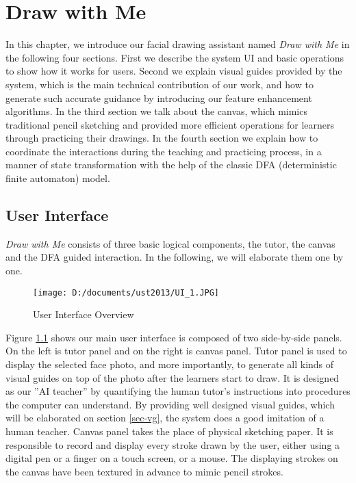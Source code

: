 \chapter{Draw with Me} \label{sec-mainwork}

		In this chapter, we introduce our facial drawing assistant named  \textit{Draw with Me}  in the following four sections. First we describe the system UI and basic operations to show how it works for users. Second we explain visual guides provided by the system, which is the main technical contribution of our work, and how to generate such accurate guidance by introducing our feature enhancement algorithms. In the third section we talk about the canvas, which mimics traditional pencil sketching and provided more efficient operations for learners through practicing their drawings. In the fourth section we explain how to coordinate the interactions during the teaching and practicing process, in a manner of state transformation with the help of the classic DFA (deterministic finite automaton) model.

\section{User Interface}

		\textit{Draw with Me} consists of three basic logical components, the tutor, the canvas and the DFA guided interaction. In the following, we will elaborate them one by one. 
	
		\begin{figure}[htbp]
			\centering
				\texttt{[image: D:/documents/ust2013/UI\_1.JPG]}
			\caption{User Interface Overview}
			\label{fig:UI}
		\end{figure}
		
		
		Figure \ref{fig:UI} shows our main user interface is composed of two side-by-side panels. On the left is tutor panel and on the right is canvas panel. Tutor panel is used to display the selected face photo, and more importantly, to generate all kinds of visual guides on top of the photo after the learners start to draw. It is designed as our ''AI teacher'' by quantifying the human tutor's instructions into procedures the computer can understand. By providing well designed visual guides, which will be elaborated on section \ref{sec-vg}, the system does a good imitation of a human teacher. Canvas panel takes the place of physical sketching paper. It is responsible to record and display every stroke drawn by the user, either using a digital pen or a finger on a touch screen, or a mouse. The displaying strokes on the canvas have been textured in advance to mimic pencil strokes. 
		
